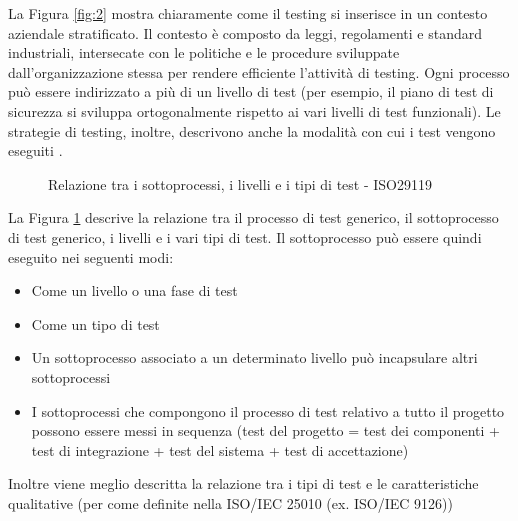 \documentclass[../main.tex]{subfiles}
\begin{document}
La Figura \ref{fig:2} mostra chiaramente come il testing si inserisce in un contesto aziendale stratificato.
Il contesto è composto da leggi, regolamenti e standard industriali, intersecate con le politiche e le procedure sviluppate dall'organizzazione stessa per rendere efficiente l'attività di testing.
Ogni processo può essere indirizzato a più di un livello di test (per esempio, il piano di test di sicurezza si sviluppa ortogonalmente rispetto ai vari livelli di test funzionali).
Le strategie di testing, inoltre, descrivono anche la modalità con cui i test vengono eseguiti \cite{iso29119}.
\begin{figure}[H]
\centering
{}
\caption{Relazione tra i sottoprocessi, i livelli e i tipi di test - ISO29119 \cite{iso29119}}\label{fig:3}
\end{figure}
La Figura \ref{fig:3} descrive la relazione tra il processo di test generico, il sottoprocesso di test generico, i livelli e i vari tipi di test.
Il sottoprocesso può essere quindi eseguito nei seguenti modi:
\begin{itemize}
\item Come un livello o una fase di test
\item Come un tipo di test
\item Un sottoprocesso associato a un determinato livello può incapsulare altri sottoprocessi
\item I sottoprocessi che compongono il processo di test relativo a tutto il progetto possono essere messi in sequenza (test del progetto = test dei componenti + test di integrazione + test del sistema + test di accettazione)
\end{itemize}
Inoltre viene meglio descritta la relazione tra i tipi di test e le caratteristiche qualitative (per come definite nella ISO/IEC 25010 (ex. ISO/IEC 9126)) \cite{iso29119}
\end{document}
